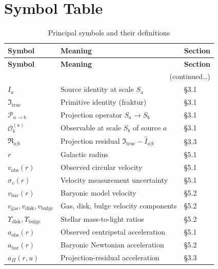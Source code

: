 \documentclass[11pt,a4paper,oneside]{article}
\newcommand{\Ia}{I_a}
\newcommand{\Itrue}{\mathfrak{I}_{\mathrm{true}}}
\newcommand{\Ihat}{\widehat{I}_{a|b}}
\newcommand{\Osp}{\mathcal{O}_b}
\newcommand{\Pab}{\mathcal{P}_{a\to b}}
\newcommand{\Rresid}{\mathfrak{R}_{a|b}}
\newcommand{\aobs}{a_{\mathrm{obs}}}
\newcommand{\abar}{a_{\mathrm{bar}}}
\newcommand{\aPi}{a_{\Pi}}
\newcommand{\vobs}{v_{\mathrm{obs}}}
\newcommand{\vbar}{v_{\mathrm{bar}}}
\newcommand{\vgas}{v_{\mathrm{gas}}}
\newcommand{\vdisk}{v_{\mathrm{disk}}}
\newcommand{\vbulge}{v_{\mathrm{bulge}}}
\newcommand{\usc}{u}                    %
\newcommand{\Upsdisk}{\Upsilon_{\mathrm{disk}}}
\newcommand{\Upsbulge}{\Upsilon_{\mathrm{bulge}}}
\begin{document}
\appendix
\section{Symbol Table}

\begin{longtable}{@{}p{4.0cm}p{6.5cm}p{2.0cm}@{}}
\caption{Principal symbols and their definitions\label{tab:symbols}}\\
\toprule
\textbf{Symbol} & \textbf{Meaning} & \textbf{Section}\\
\midrule
\endfirsthead
\toprule
\textbf{Symbol} & \textbf{Meaning} & \textbf{Section}\\
\midrule
\endhead
\midrule\multicolumn{3}{r}{\small(continued\ldots)}\\
\endfoot
\bottomrule
\endlastfoot
$\Ia$           & Source identity at scale $S_a$                     & \S3.1 \\[2pt]
$\Itrue$        & Primitive identity (fraktur)                        & \S3.1 \\[2pt]
$\Pab$          & Projection operator $S_a \to S_b$                   & \S3.1 \\[2pt]
$\Osp^{(a)}$    & Observable at scale $S_b$ of source $a$             & \S3.1 \\[2pt]
$\Rresid$       & Projection residual $\Itrue - \Ihat$                & \S3.3 \\[6pt]
$r$             & Galactic radius                                     & \S5.1 \\[2pt]
$\vobs(r)$      & Observed circular velocity                          & \S5.1 \\[2pt]
$\sigma_v(r)$   & Velocity measurement uncertainty                    & \S5.1 \\[2pt]
$\vbar(r)$      & Baryonic model velocity                             & \S5.2 \\[2pt]
$\vgas,\vdisk,\vbulge$ & Gas, disk, bulge velocity components          & \S5.2 \\[2pt]
$\Upsdisk,\Upsbulge$   & Stellar mass-to-light ratios                  & \S5.2 \\[6pt]
$\aobs(r)$      & Observed centripetal acceleration                   & \S5.1 \\[2pt]
$\abar(r)$      & Baryonic Newtonian acceleration                     & \S5.2 \\[2pt]
$\aPi(r,\usc)$  & Projection-residual acceleration                    & \S3.3 \\[2pt]

\end{longtable}
\end{document}
